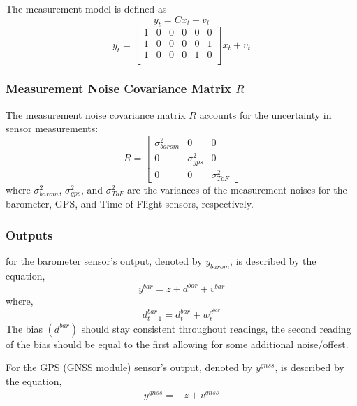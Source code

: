 \documentclass{article}
\begin{document}
    The measurement model is defined as
    \begin{equation}
    y_t = C x_t + v_t
    \end{equation}
    \begin{equation}
        y_t  = 
        \begin{bmatrix}
            1 & 0 & 0 & 0 & 0 & 0 \\
            1 & 0 & 0 & 0 & 0 & 1 \\
            1 & 0 & 0 & 0 & 1 & 0 \\
        \end{bmatrix}
            x_t + v_t
    \end{equation}
    \subsubsection*{Measurement Noise Covariance Matrix \( R \)}
    The measurement noise covariance matrix \( R \) accounts for the uncertainty in sensor measurements:
    \begin{equation}
    R = 
    \begin{bmatrix}
    \sigma_{barom}^2 & 0 & 0 \\
    0 & \sigma_{gps}^2 & 0 \\
    0 & 0 & \sigma_{ToF}^2
    \end{bmatrix}
    \end{equation}
    where \( \sigma_{barom}^2 \), \( \sigma_{gps}^2 \), and \( \sigma_{ToF}^2 \) are the variances of the measurement noises for the 
    barometer, GPS, and Time-of-Flight sensors, respectively.

    \subsubsection*{Outputs}
    for the barometer sensor's output, denoted by \( y_{barom} \), is described by the equation,
    \begin{equation}
    y^{bar} = z + d^{bar} + v^{bar}
    \end{equation}
    where, 
    \begin{equation}
        d^{bar}_{t+1} = d^{bar}_t + w_{t}^{d^{bar}}
    \end{equation}
    The bias $(d^{bar})$ should stay consistent throughout readings, 
    the second reading of the bias should be equal to the first allowing for some additional noise/offest.

    For the GPS (GNSS module) sensor's output, 
    denoted by \( y^{gnss} \), is described by the equation,
    \begin{subequations}
        \begin{align}
            y^{gnss} 
            {}={}&
            z + v^{gnss} 
        \end{align}
    \end{subequations}
\end{document}
